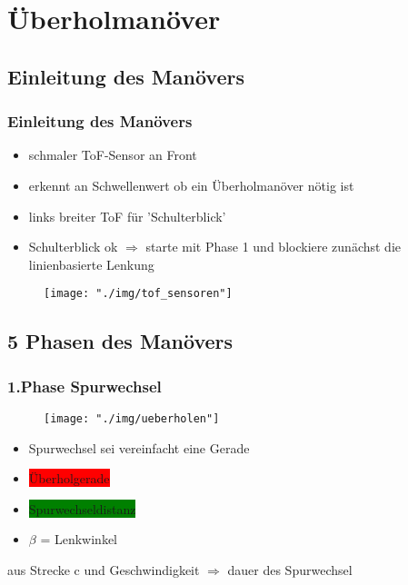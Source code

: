 \documentclass{beamer}
\begin{document}
	
	\section{Überholmanöver}
	
	\subsection{Einleitung des Manövers}
	
	\begin{frame}
		\frametitle{Einleitung des Manövers}
		\begin{itemize}
			\item schmaler ToF-Sensor an Front
			\item erkennt an Schwellenwert ob ein Überholmanöver nötig ist
			\item links breiter ToF für 'Schulterblick'
			\item Schulterblick ok $\Rightarrow$ starte mit Phase 1 und blockiere zunächst die linienbasierte Lenkung
		\end{itemize}
		\begin{center}
			\begin{figure}[h]
				\texttt{[image: "./img/tof\_sensoren"]}
				\label{fig:topdown}
			\end{figure}
		\end{center}
	\end{frame}
	
	\subsection{5 Phasen des Manövers}
	
	\begin{frame}
		\frametitle{1.Phase Spurwechsel}
		\begin{center}
			\begin{figure}[h]
				\texttt{[image: "./img/ueberholen"]}
				\label{fig:topdown}
			\end{figure}
		\end{center}
		\begin{itemize}
			\item Spurwechsel sei vereinfacht eine Gerade
			\item \colorbox{red}{Überholgerade}
			\item \colorbox{green}{Spurwechseldistanz}
			\item $\beta$ = Lenkwinkel
		\end{itemize}
		aus Strecke c und Geschwindigkeit $\Rightarrow$  dauer des Spurwechsel
	\end{frame}
	
\end{document}
